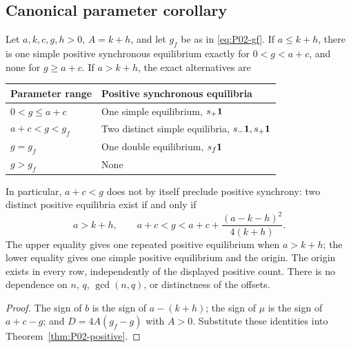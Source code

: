 \subsection{Canonical parameter corollary}

\begin{corollary}
\label{cor:P02-canonical}
Let $a,k,c,g,h>0$, $A=k+h$, and let $g_f$ be as in
\eqref{eq:P02-gf}. If $a\le k+h$, there is one simple positive
synchronous equilibrium exactly for $0<g<a+c$, and none for
$g\ge a+c$. If $a>k+h$, the exact alternatives are
\begin{center}
\begin{tabular}{@{}ll@{}}
\toprule
Parameter range & Positive synchronous equilibria\\
\midrule
$0<g\le a+c$ & One simple equilibrium, $s_+\mathbf{1}$\\
$a+c<g<g_f$ & Two distinct simple equilibria, $s_-\mathbf{1},s_+\mathbf{1}$\\
$g=g_f$ & One double equilibrium, $s_f\mathbf{1}$\\
$g>g_f$ & None\\
\bottomrule
\end{tabular}
\end{center}
In particular, $a+c<g$ does not by itself preclude positive
synchrony: two distinct positive equilibria exist if and only if
\begin{equation}
\label{eq:P02-two-positive-original}
 a>k+h,\qquad
 a+c<g<a+c+\frac{(a-k-h)^2}{4(k+h)}.
\end{equation}
The upper equality gives one repeated positive equilibrium when
$a>k+h$; the lower equality gives one simple positive equilibrium
and the origin. The origin exists in every row, independently of
the displayed positive count. There is no dependence on $n$, $q$,
$\gcd(n,q)$, or distinctness of the offsets.
\end{corollary}

\begin{proof}
The sign of $b$ is the sign of $a-(k+h)$; the sign of $\mu$ is
the sign of $a+c-g$; and $D=4A(g_f-g)$ with $A>0$.
Substitute these identities into Theorem~\ref{thm:P02-positive}.
\end{proof}

